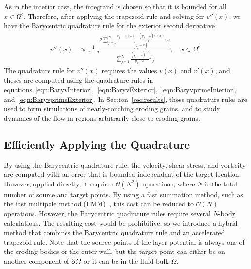 \documentclass{jfm}
\begin{document}
As in the interior case, the integrand is chosen so that it is bounded
for all $x \in \Omega^c$.  Therefore, after applying the trapezoid rule
and solving for $v''(x)$, we have the Barycentric quadrature rule for
the exterior second derivative
\begin{align}
  v''(x) &\approx \frac{1}{x-a}\frac{2\sum\limits_{j=1}^N
    \frac{v^{+}_{j} - v(x) - (y_j-x)v'(x)}{(y_j-x)^3}w_j}
    {\sum\limits_{j=1}^N \frac{(y_j-a)^{-1}}{y_j-x}w_j}, 
    \quad x \in \Omega^c.
\end{align}
The quadrature rule for $v''(x)$ requires the values $v(x)$ and $v'(x)$,
and theses are computed using the quadrature rules in
equations~\eqref{eqn:BaryvInterior},~\eqref{eqn:BaryvExterior},~\eqref{eqn:BaryvprimeInterior},
and~\eqref{eqn:BaryvprimeExterior}. In Section~\ref{sec:results}, these
quadrature rules are used to form simulations of nearly-touching eroding
grains, and to study dynamics of the flow in regions arbitrarily close
to eroding grains.

\subsection{Efficiently Applying the Quadrature}
\label{sec:fmm}
By using the Barycentric quadrature rule, the velocity, shear stress,
and vorticity are computed with an error that is bounded independent of
the target location. However, applied directly, it requires
$\mathcal{O}(N^2)$ operations, where $N$ is the total number of source
and target points.  By using a fast summation method, such as the fast
multipole method (FMM)~\citep{gre-rok1987}, this cost can be reduced to
$\mathcal{O}(N)$ operations.  However, the Barycentric quadrature rules
require several $N$-body calculations.  The resulting cost would be
prohibitive, so we introduce a hybrid method that combines the
Barycentric quadrature rule and an accelerated trapezoid rule.  Note
that the source points of the layer potential is always one of the
eroding bodies or the outer wall, but the target point can either be on
another component of ${\partial}\varOmega$ or it can be in the fluid bulk
$\Omega$.
\end{document}
